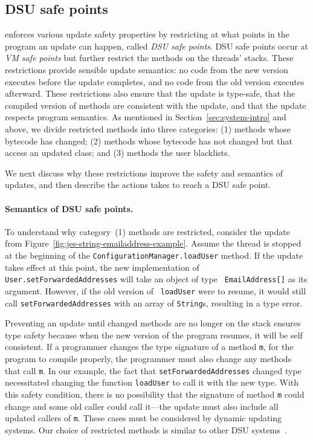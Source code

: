 \subsection{DSU safe points}
\label{sec:safe}

\JV enforces various update safety properties by restricting at what points
in the program an update can happen, called {\em DSU safe points}.  DSU
safe points occur at \emph{VM safe points} but further restrict the methods
on the threads' stacks.  These restrictions provide sensible update
semantics: no code from the new version executes before the update
completes, and no code from the old version executes afterward. These
restrictions also ensure that the update is type-safe, that the compiled
version of methods are consistent with the update, and that the update
respects program semantics.  As mentioned in Section~\ref{sec:system-intro} and
above, we
divide restricted methods into three categories: (1) methods whose bytecode
has changed; (2) methods whose bytecode has not changed but that access an
updated class; and (3) methods the user blacklists.

We next discuss why these restrictions improve the safety and semantics of
updates, and then describe the actions \JV takes to reach a DSU safe
point.

\paragraph{Semantics of DSU safe points.}

To understand why
category~(1) methods are restricted, consider the update from
Figure~\ref{fig:jes-string-emailaddress-example}.  Assume the thread is
stopped at the beginning of the {\tt ConfigurationManager.loadUser} method.
If the update takes effect at this point, the new implementation of {\tt
User.setFor\-wardedAddresses} will take an object of type {\tt
EmailAddress[]} as its argument.  However, if the old version of {\tt
loadUser} were to resume, it would still call {\tt setForwardedAddresses}
with an array of {\tt String}s, resulting in a type error.

Preventing an update until changed methods are no longer on the stack
ensures type safety because when the new version of the program resumes, it
will be self consistent.  If a programmer changes the type signature of a
method {\tt m}, for the program to compile properly, the programmer must
also change any methods that call {\tt m}.  In our example, the fact that
{\tt setForwardedAddresses} changed type necessitated changing the function
{\tt loadUser} to call it with the new type.  With this safety condition,
there is no possibility that the signature of method {\tt m} could change
and some old caller could call it---the update must also include all
updated callers of {\tt m}.
These cases must be considered by dynamic updating systems.
Our choice of restricted methods is similar to other DSU
systems~\cite{ritzau00dynamic, Mala00a, altekar05opus, eaddy05enc,
JVMhotswap, VSEnC, chen:icse07, K42reconfig}.

